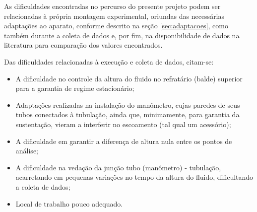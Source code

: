As dificuldades encontradas no percurso do presente projeto podem ser
relacionadas à própria montagem experimental, oriundas das necessárias
adaptações ao aparato, conforme descrito na seção \ref{sec:adaptacoes}, como
também durante a coleta de dados e, por fim, na disponibilidade de dados na
literatura para comparação dos valores encontrados.

Das dificuldades relacionadas à execução e coleta de dados, citam-se:
\begin{itemize}
\item A dificuldade no controle da altura do fluido no refratário (balde)
  superior para a garantia de regime estacionário;
\item Adaptações realizadas na instalação do manômetro, cujas paredes de seus
  tubos conectados à tubulação, ainda que, minimamente, para garantia da
  sustentação, vieram a interferir no escoamento (tal qual um acessório);
\item A dificuldade em garantir a diferença de altura nula entre os pontos de
  análise;
\item A dificuldade na vedação da junção tubo (manômetro) - tubulação,
acarretando em pequenas variações no tempo da altura do fluido, dificultando a
coleta de dados;
\item Local de trabalho pouco adequado.
\end{itemize}


